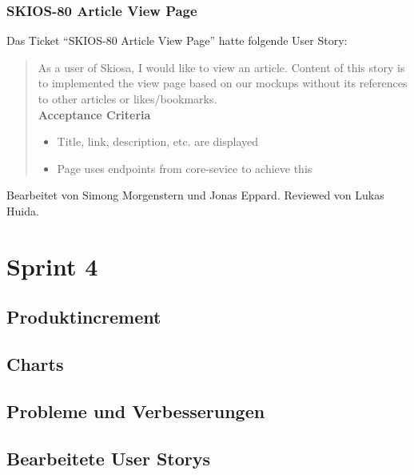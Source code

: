 \subsubsection{SKIOS-80 Article View Page}
Das Ticket \enquote{SKIOS-80 Article View Page} hatte folgende User Story:
\begin{quotation}
    As a user of Skiosa, I would like to view an article.
    Content of this story is to implemented the view page based on our mockups without its references to other articles or likes/bookmarks. \\
\textbf{Acceptance Criteria}
\begin{itemize}
    \item Title, link, description, etc. are displayed 
    \item Page uses endpoints from core-sevice to achieve this
\end{itemize}
\end{quotation}
Bearbeitet von Simong Morgenstern und Jonas Eppard.
Reviewed von Lukas Huida.

\section{Sprint 4}
\subsection{Produktincrement}
\subsection{Charts}
\subsection{Probleme und Verbesserungen}

\subsection{Bearbeitete User Storys}
